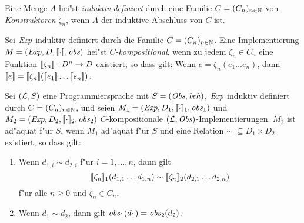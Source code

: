\documentclass[12pt,a4paper]{article}
\begin{document}
\begin{definition}
  Eine Menge $A$ hei"st \emph{induktiv definiert} durch eine Familie $C = (C_n)_{n\in\mathbb N}$ von
  \emph{Konstruktoren} $\zeta_n$, wenn $A$ der induktive Abschluss von $C$ ist.
\end{definition}

\begin{definition}[Kompositionalit"at]
  Sei $\mathit{Exp}$ induktiv definiert durch die Familie $C=(C_n)_{n\in\mathbb N}$.
  Eine Implementierung $M=(\mathit{Exp},D,[\![\cdot]\!],\mathit{obs})$ hei"st \emph{$C$-kompositional},
  wenn zu jedem $\zeta_n \in C_n$ eine Funktion $[\![\zeta_n]\!]: D^n \to D$ existiert, so dass gilt:
  Wenn $e = \zeta_n (e_1 \ldots e_n)$, dann 
  $\semantic{e} = \semantic{\zeta_n}(\semantic{e_1} \ldots \semantic{e_n})$.
\end{definition}

\begin{theorem}
  Sei $(\mathcal L,S)$ eine Programmiersprache mit $S=(\mathit{Obs},\mathit{beh})$, $\mathit{Exp}$ induktiv definiert durch
  $C=(C_n)_{n\in\mathbb N}$, und seien $M_1=(\mathit{Exp},D_1,[\![\cdot]\!]_1,\mathit{obs}_1)$ und
  $M_2 = (\mathit{Exp},D_2,[\![\cdot]\!]_2,\mathit{obs}_2)$ $C$-kompositionale $(\mathcal L,\mathit{Obs})$-Implementierungen.
  $M_2$ ist ad"aquat f"ur $S$, wenn $M_1$ ad"aquat f"ur $S$ und eine Relation $\sim\ \subseteq D_1 \times D_2$
  existiert, so dass gilt:
  \begin{enumerate}
  \item Wenn $d_{1,i} \sim d_{2,i}$ f"ur $i=1,\ldots,n$, dann gilt
    \[[\![\zeta_n]\!]_1 (d_{1,1} \ldots d_{1,n}) \sim [\![\zeta_n]\!]_2 (d_{2,1} \ldots d_{2,n})\]
    f"ur alle $n \ge 0$ und $\zeta_n \in C_n$.
  \item Wenn $d_1 \sim d_2$, dann gilt $\mathit{obs}_1(d_1) = \mathit{obs}_2(d_2)$.
  \end{enumerate}
\end{theorem}
\end{document}
